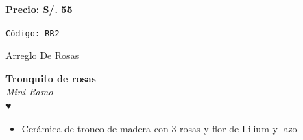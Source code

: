 \documentclass[12pt]{article}
\begin{document}
\vspace{0.3cm}
\begin{center}
   \textbf{\Large Precio: \textcolor[HTML]{228B22}{S/. 55 }}
\end{center}
\begin{center}
    \textcolor[HTML]{191970}{\texttt{Código: RR2}}
\end{center}
\vspace{1cm}
\newpage
\begin{center}\textcolor[HTML]{191970}{\huge Arreglo De Rosas}\end{center}
\noindent
\begin{minipage}{0.6\textwidth}
    \textcolor[HTML]{FF8C00}{\textbf{\huge Tronquito de rosas }}\\
    {\textit{Mini Ramo}} \\
    \textcolor[HTML]{FF8C00}{\Huge ♥} \\
    \vspace{0.5cm}
    \begin{itemize}
        \item Cerámica de tronco de madera con 3 rosas y flor de Lilium y lazo
    \end{itemize}
\end{minipage}
\hspace{1cm}
\end{document}

